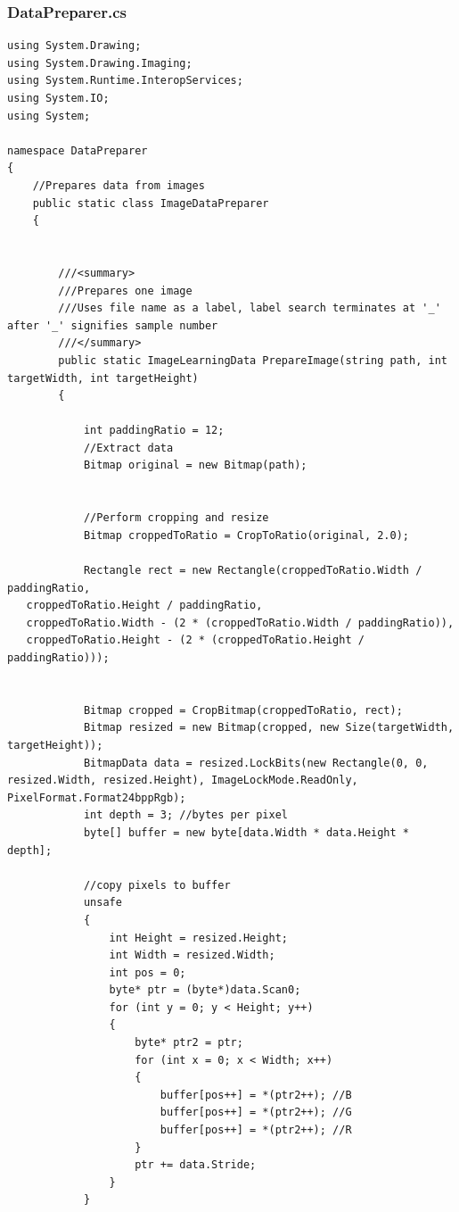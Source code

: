 \documentclass[12pt,a4paper]{article}
\begin{document}
\subsubsection*{DataPreparer.cs}
\begin{lstlisting}
using System.Drawing;
using System.Drawing.Imaging;
using System.Runtime.InteropServices;
using System.IO;
using System;

namespace DataPreparer
{
    //Prepares data from images
    public static class ImageDataPreparer
    {


        ///<summary>
        ///Prepares one image
        ///Uses file name as a label, label search terminates at '_' after '_' signifies sample number
        ///</summary>
        public static ImageLearningData PrepareImage(string path, int targetWidth, int targetHeight)
        {

            int paddingRatio = 12;
            //Extract data
            Bitmap original = new Bitmap(path);


            //Perform cropping and resize
            Bitmap croppedToRatio = CropToRatio(original, 2.0);

            Rectangle rect = new Rectangle(croppedToRatio.Width / paddingRatio,
   croppedToRatio.Height / paddingRatio,
   croppedToRatio.Width - (2 * (croppedToRatio.Width / paddingRatio)),
   croppedToRatio.Height - (2 * (croppedToRatio.Height / paddingRatio)));


            Bitmap cropped = CropBitmap(croppedToRatio, rect);
            Bitmap resized = new Bitmap(cropped, new Size(targetWidth, targetHeight));
            BitmapData data = resized.LockBits(new Rectangle(0, 0, resized.Width, resized.Height), ImageLockMode.ReadOnly, PixelFormat.Format24bppRgb);
            int depth = 3; //bytes per pixel
            byte[] buffer = new byte[data.Width * data.Height * depth];

            //copy pixels to buffer
            unsafe
            {
                int Height = resized.Height;
                int Width = resized.Width;
                int pos = 0;
                byte* ptr = (byte*)data.Scan0;
                for (int y = 0; y < Height; y++)
                {
                    byte* ptr2 = ptr;
                    for (int x = 0; x < Width; x++)
                    {
                        buffer[pos++] = *(ptr2++); //B
                        buffer[pos++] = *(ptr2++); //G
                        buffer[pos++] = *(ptr2++); //R
                    }
                    ptr += data.Stride;
                }
            }


\end{lstlisting}
\end{document}
